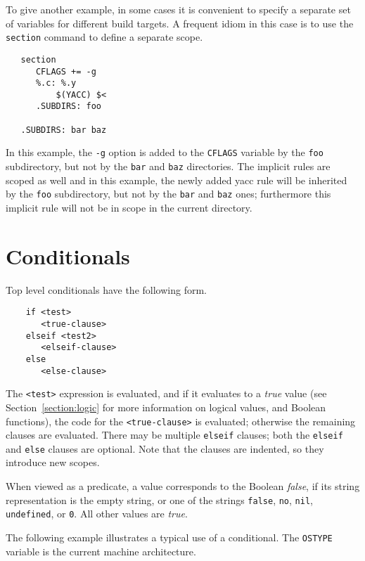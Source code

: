 To give another example, in some cases it is convenient to specify a
separate set of variables for different build targets.  A frequent
idiom in this case is to use the \verb+section+ command to define a
separate scope.

\begin{verbatim}
   section
      CFLAGS += -g
      %.c: %.y
          $(YACC) $<
      .SUBDIRS: foo

   .SUBDIRS: bar baz
\end{verbatim}

In this example, the \verb+-g+ option is added to the \verb+CFLAGS+
variable by the \verb+foo+ subdirectory, but not by the \verb+bar+ and
\verb+baz+ directories. The implicit rules are scoped as well and in this
example, the newly added yacc rule will be inherited by the \verb+foo+
subdirectory, but not by the \verb+bar+ and \verb+baz+ ones; furthermore
this implicit rule will not be in scope in the current directory.

\section{Conditionals}
\label{section:conditionals}

Top level conditionals have the following form.

\begin{verbatim}
    if <test>
       <true-clause>
    elseif <test2>
       <elseif-clause>
    else
       <else-clause>
\end{verbatim}

The \verb+<test>+ expression is evaluated, and if it evaluates to a \emph{true} value (see
Section~\ref{section:logic} for more information on logical values, and Boolean functions), the code
for the \verb+<true-clause>+ is evaluated; otherwise the remaining clauses are evaluated.  There may
be multiple \verb+elseif+ clauses; both the \verb+elseif+ and \verb+else+ clauses are optional.
Note that the clauses are indented, so they introduce new scopes.

When viewed as a predicate, a value corresponds to the Boolean \emph{false}, if its string
representation is the empty string, or one of the strings \verb+false+, \verb+no+, \verb+nil+,
\verb+undefined+, or \verb+0+.  All other values are \emph{true}.

The following example illustrates a typical use of a conditional.  The
\verb+OSTYPE+ variable is the current machine architecture.

